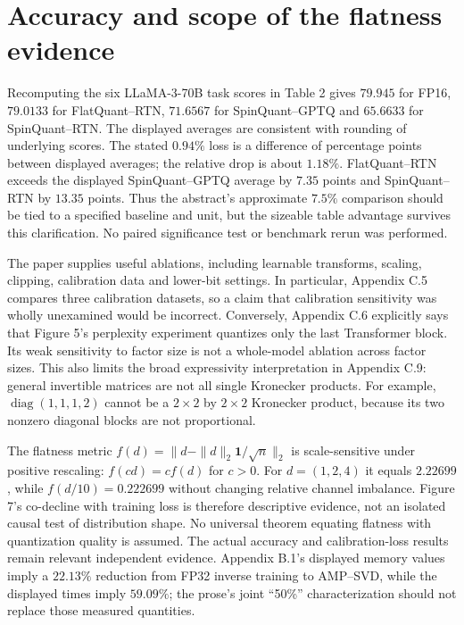\documentclass[10pt]{article}
\begin{document}
\section*{Accuracy and scope of the flatness evidence}
Recomputing the six LLaMA-3-70B task scores in Table 2 gives \(79.945\) for FP16, \(79.0133\) for FlatQuant–RTN, \(71.6567\) for SpinQuant–GPTQ and \(65.6633\) for SpinQuant–RTN. The displayed averages are consistent with rounding of underlying scores. The stated \(0.94\%\) loss is a difference of percentage points between displayed averages; the relative drop is about \(1.18\%\). FlatQuant–RTN exceeds the displayed SpinQuant–GPTQ average by \(7.35\) points and SpinQuant–RTN by \(13.35\) points. Thus the abstract’s approximate \(7.5\%\) comparison should be tied to a specified baseline and unit, but the sizeable table advantage survives this clarification. No paired significance test or benchmark rerun was performed.\par
The paper supplies useful ablations, including learnable transforms, scaling, clipping, calibration data and lower-bit settings. In particular, Appendix C.5 compares three calibration datasets, so a claim that calibration sensitivity was wholly unexamined would be incorrect. Conversely, Appendix C.6 explicitly says that Figure 5’s perplexity experiment quantizes only the last Transformer block. Its weak sensitivity to factor size is not a whole-model ablation across factor sizes. This also limits the broad expressivity interpretation in Appendix C.9: general invertible matrices are not all single Kronecker products. For example, \(\operatorname{diag}(1,1,1,2)\) cannot be a \(2\times2\) by \(2\times2\) Kronecker product, because its two nonzero diagonal blocks are not proportional.\par
The flatness metric \(f(d)=\|d-\|d\|_2\mathbf1/\sqrt n\|_2\) is scale-sensitive under positive rescaling: \(f(cd)=c f(d)\) for \(c>0\). For \(d=(1,2,4)\) it equals \(2.22699\), while \(f(d/10)=0.222699\) without changing relative channel imbalance. Figure 7’s co-decline with training loss is therefore descriptive evidence, not an isolated causal test of distribution shape. No universal theorem equating flatness with quantization quality is assumed. The actual accuracy and calibration-loss results remain relevant independent evidence. Appendix B.1’s displayed memory values imply a \(22.13\%\) reduction from FP32 inverse training to AMP–SVD, while the displayed times imply \(59.09\%\); the prose’s joint “50\%” characterization should not replace those measured quantities.\par
\end{document}
